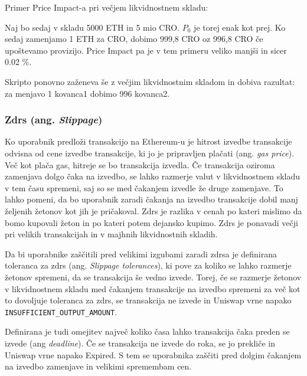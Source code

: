 \documentclass[a4paper,12pt]{article}%
\begin{document}
Primer Price Impact-a pri večjem likvidnostnem skladu:

Naj bo sedaj v skladu 5000 ETH in 5 mio CRO. $P_0$ je torej enak kot prej. Ko sedaj zamenjamo 1 ETH za CRO, dobimo 999,8 CRO oz 996,8 CRO če upoštevamo provizijo. Price Impact pa je v tem primeru veliko manjši in sicer 0.02 \%. 

Skripto ponovno zaženeva še z večjim likvidnostnim skladom in dobiva razultat: za menjavo 1 kovanca1 dobimo 996 kovanca2.

\subsubsection{Zdrs (ang. \textit{Slippage})}

Ko uporabnik predloži transakcijo na Ethereum-u je hitrost izvedbe transakcije odvisna od cene izvedbe transakcije, ki jo je pripravljen plačati (ang. \textit{gas price}). Več kot plača gas, hitreje se bo transakcija izvedla. Če transakcija oziroma zamenjava dolgo čaka na izvedbo, se lahko razmerje valut v likvidnostnem skladu v tem času spremeni, saj so se med čakanjem izvedle že druge zamenjave. To lahko pomeni, da bo uporabnik zaradi čakanja na izvedbo transakcije dobil manj željenih žetonov kot jih je pričakoval. Zdrs je razlika v cenah po kateri mislimo da bomo kupovali žeton in po kateri potem dejansko kupimo. Zdrs je ponavadi večji pri velikih transakcijah in v majhnih likvidnostnih skladih.

Da bi uporabnike zaščitili pred velikimi izgubami zaradi zdrsa je definirana toleranca za zdrs (ang. \textit{Slippage tolerances}), ki pove za koliko se lahko razmerje žetonov spremeni, da se transakcija še vedno izvede. Torej, če se razmerje žetonov v likvidnostnem skladu med čakanjem transakcije na izvedbo spremeni za več kot to dovoljuje toleranca za zdrs, se transakcija ne izvede in Uniswap vrne napako \texttt{INSUFFICIENT\_OUTPUT\_AMOUNT}. 

Definirana je tudi omejitev največ koliko časa lahko transakcija čaka preden se izvede (ang \textit{deadline}). Če se transakcija ne izvede do roka, se jo prekliče in Uniswap vrne napako Expired. S tem se uporabnika zaščiti pred dolgim čakanjem na izvedbo zamenjave in velikimi spremembam cen.

\medskip
\end{document}
